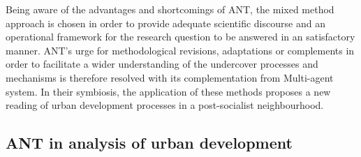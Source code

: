 \documentclass[11pt]{report}
\begin{document}
Being aware of the advantages and shortcomings of ANT, the mixed method approach is chosen in order to provide adequate scientific discourse and an operational framework for the research question to be answered in an satisfactory manner.
ANT's urge for methodological revisions, adaptations or complements  in order to facilitate a wider understanding of the undercover processes and mechanisms is therefore resolved with its complementation from Multi-agent system.
In their symbiosis, the application of these methods proposes a new reading of urban development processes in a post-socialist neighbourhood.

\subsection{ANT in analysis of urban development}
\end{document}
